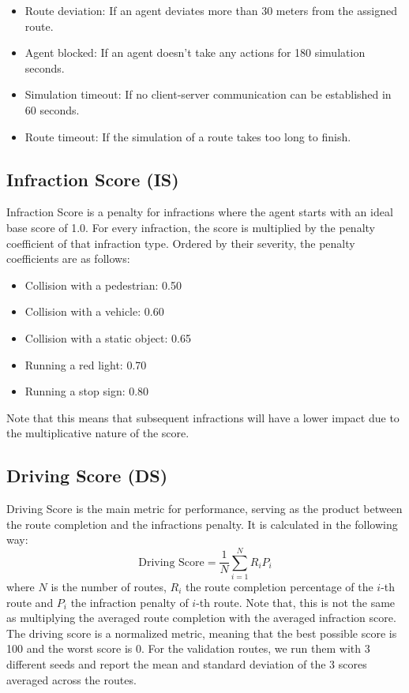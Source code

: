 \documentclass[12pt, letterpaper,cleardoubleempty,BCOR1cm]{scrbook}
\begin{document}
\begin{itemize}
\item Route deviation: If an agent deviates more than 30 meters from the assigned route.
\item Agent blocked: If an agent doesn’t take any actions for 180 simulation seconds.
\item Simulation timeout: If no client-server communication can be established in 60 seconds.
\item Route timeout: If the simulation of a route takes too long to finish.
\end{itemize}

\subsection{Infraction Score (IS)}
\label{sec:org2f789db}
Infraction Score is a penalty for infractions where the agent starts with
an ideal base score of 1.0. For every infraction, the score is multiplied by the
penalty coefficient of that infraction type. Ordered by their severity, the
penalty coefficients are as follows:
\begin{itemize}
\item Collision with a pedestrian: 0.50
\item Collision with a vehicle: 0.60
\item Collision with a static object: 0.65
\item Running a red light: 0.70
\item Running a stop sign: 0.80
\end{itemize}
Note that this means that subsequent infractions will have a lower impact due to the
multiplicative nature of the score.

\subsection{Driving Score (DS)}
\label{sec:orgbf0416f}
Driving Score is the main metric for performance, serving as the product between
the route completion and the infractions penalty. It is calculated in the
following way: \[\text{Driving Score}=\frac1N\sum_{i=1}^{N}R_{i}P_{i}\] where \(N\) is the
number of routes, \(R_{i}\) the route completion percentage of the \(i\)-th route and
\(P_{i}\) the infraction penalty of \(i\)-th route. Note that, this is not the
same as multiplying the averaged route completion with the averaged infraction
score. The driving score is a normalized metric, meaning that the best possible
score is 100 and the worst score is 0. For the validation routes, we run them
with 3 different seeds and report the mean and standard deviation of the 3
scores averaged across the routes.
\end{document}
